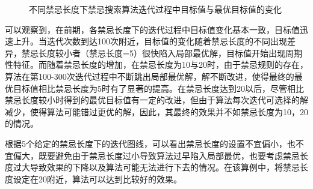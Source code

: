 \documentclass{article}
\begin{document}
    \begin{figure}[H]
        \centering
        \quad
        \caption{不同禁忌长度下禁忌搜索算法迭代过程中目标值与最优目标值的变化}
    \end{figure}

    可以观察到，在前期，各禁忌长度下的迭代过程中目标值变化基本一致，目标值迅速上升。当迭代次数到达100次附近，目标值的变化随着禁忌长度的不同出现差异，禁忌长度较小者（禁忌长度=5）很快陷入局部最优解，目标值开始出现周期性特征。而随着禁忌长度的增加，在禁忌长度为10与20时，由于禁忌规则的存在，算法在第100-300次迭代过程中不断跳出局部最优解，解不断改进，使得最终的最优目标值相比禁忌长度为5时有了显著的提高。在禁忌长度达到20以后，尽管相比禁忌长度较小时得到的最优目标值有一定的改进，但由于算法每次迭代可选择的解减少，使得算法可能错过更优的解，因此，其最终的效果并不如禁忌长度为10，20的情况。
    
    根据5个给定的禁忌长度下的迭代图线，可以看出禁忌长度的设置不宜偏小，也不宜偏大，既要避免由于禁忌长度过小导致算法过早陷入局部最优，也要考虑禁忌长度过大导致效果的下降以及算法可能无法进行下去的情况。在该算例中，将禁忌长度设定在20附近，算法可以达到比较好的效果。
\end{document}
